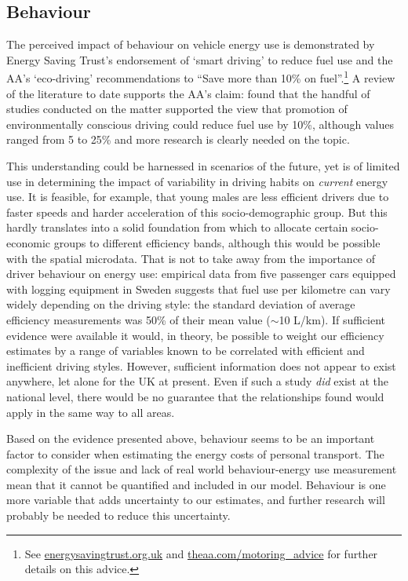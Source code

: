 \subsection{Behaviour}
The perceived impact of behaviour on vehicle energy use is demonstrated
by Energy Saving Trust's endorsement of `smart driving' to reduce fuel use
 and the AA's `eco-driving' recommendations to ``Save more than 10\% on
 fuel''.\footnote{See
 \href{http://www.energysavingtrust.org.uk/Travel/Driving}{energysavingtrust.org.uk}
and \href{http://www.theaa.com/motoring_advice/fuels-and-environment/drive-smart.html}
{theaa.com/motoring\_advice}
for further details on this advice.
}
A review of the literature to date supports the AA's claim:
\citet{Barkenbus2010} found that the handful of studies conducted
on the matter supported the view that promotion of environmentally conscious
driving could reduce fuel use by 10\%, although values ranged from 5 to 25\%
and more research is clearly needed on the topic.

This understanding could be harnessed in scenarios of the future, yet is of limited
use in determining the impact of variability in driving habits on \emph{current}
energy use. It is feasible, for example, that young males are less efficient drivers
due to faster speeds \citep{fleiter2007choosing} and harder acceleration
of this socio-demographic group. But this hardly translates into a
solid foundation from which to allocate certain socio-economic groups
to different efficiency bands, although this would be possible with the
spatial microdata. That is not to take away from the importance of driver
behaviour on energy use: 
empirical data from five passenger cars equipped with
logging equipment in Sweden \citep{Ericsson2001a} suggests that
fuel use per kilometre can vary widely depending on the driving style:
the standard deviation of average efficiency measurements was 50\%
of their mean value ($\sim$10 L/km). If sufficient evidence were available
it would, in theory, be possible to weight our efficiency estimates
by a range of variables known to be correlated with efficient and
inefficient driving styles. However, sufficient information does
not appear to exist anywhere, let alone for the UK at present.
Even if such a study \emph{did} exist at the national level,
there would be no guarantee that the relationships found would apply in the
same way to all areas.

Based on the evidence presented above, behaviour seems to be an important factor
to consider when estimating the energy costs of personal transport.
The complexity of the issue and lack of real world behaviour-energy use
measurement mean that it cannot be quantified and included in our model.
Behaviour is one more variable that adds uncertainty to our estimates,
and further research will probably be needed to reduce this uncertainty.

